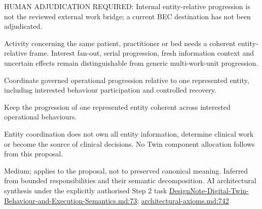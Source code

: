 HUMAN ADJUDICATION REQUIRED: Internal entity-relative progression is not the reviewed external work bridge; a current BEC destination has not been adjudicated.



Activity concerning the same patient, practitioner or bed needs a coherent entity-relative frame. Interest fan-out, serial progression, fresh information context and uncertain effects remain distinguishable from generic multi-work-unit progression.



Coordinate governed operational progression relative to one represented entity, including interested behaviour participation and controlled recovery.



Keep the progression of one represented entity coherent across interested operational behaviours.



Entity coordination does not own all entity information, determine clinical work or become the source of clinical decisions. No Twin component allocation follows from this proposal.


Medium; applies to the proposal, not to preserved canonical meaning.
Inferred from bounded responsibilities and their semantic decomposition. AI architectural synthesis under the explicitly authorised Step 2 task \hyperref[evidence:ec6250f7cf7c29a5]{DesignNote-Digital-Twin-Behaviour-and-Execution-Semantics.md:73}; \hyperref[evidence:27549d51551beae6]{architectural-axioms.md:742}
